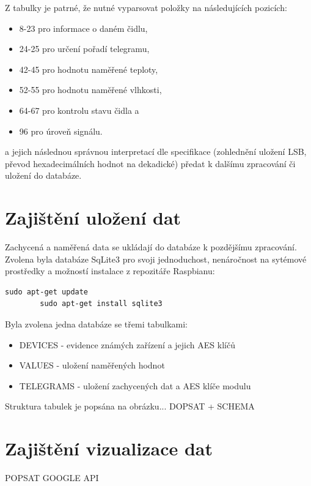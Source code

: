 Z tabulky je patrné, že nutné vyparsovat položky na následujících pozicích:
\begin{itemize}
	\item 8-23 pro informace o daném čidlu,
	\item 24-25 pro určení pořadí telegramu,
	\item 42-45 pro hodnotu naměřené teploty,
	\item 52-55 pro hodnotu naměřené vlhkosti,
	\item 64-67 pro kontrolu stavu čidla a
	\item 96 pro úroveň signálu.	
\end{itemize}

a jejich následnou správnou interpretací dle specifikace (zohlednění uložení LSB, převod hexadecimálních hodnot na dekadické) předat k dalšímu zpracování či uložení do databáze.


\section{Zajištění uložení dat}
Zachycená a naměřená data se ukládají do databáze k pozdějšímu zpracování. Zvolena byla databáze SqLite3 pro svoji jednoduchost, nenáročnost na sytémové prostředky a možností instalace z repozitáře Raspbianu:
 
\begin{lstlisting}[style=MyCodeBash]
		sudo apt-get update
		sudo apt-get install sqlite3
	\end{lstlisting}

Byla zvolena jedna databáze se třemi tabulkami:
\begin{itemize}
	\item DEVICES - evidence známých zařízení a jejich AES klíčů
	\item VALUES - uložení naměřených hodnot
	\item TELEGRAMS - uložení zachycených dat a AES klíče modulu
\end{itemize}

Struktura tabulek je popsána na obrázku... \colorbox[rgb]{1,0,0}{DOPSAT + SCHEMA}
	
\section{Zajištění vizualizace dat}	
\colorbox[rgb]{1,0,0}{POPSAT GOOGLE API}

